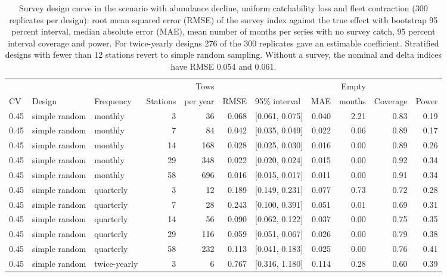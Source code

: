 \documentclass[11pt,a4paper]{article}
\begin{document}
\begin{table}[htbp]
\centering\scriptsize
\setlength{\tabcolsep}{2.5pt}
\caption{Survey design curve in the scenario with abundance decline, uniform catchability loss and fleet contraction (300 replicates per design): root mean squared error (RMSE) of the survey index against the true effect with bootstrap 95 percent interval, median absolute error (MAE), mean number of months per series with no survey catch, 95 percent interval coverage and power. For twice-yearly designs 276 of the 300 replicates gave an estimable coefficient. Stratified designs with fewer than 12 stations revert to simple random sampling. Without a survey, the nominal and delta indices have RMSE 0.054 and 0.061.}
\label{tab:designcurve}
\begin{tabular}{@{}lllrrrlrrrr@{}}
\toprule
& & & & Tows & & & & Empty & & \\
CV & Design & Frequency & Stations & per year & RMSE & 95\% interval & MAE & months & Coverage & Power \\
\midrule
0.45 & simple random & monthly &  3 &  36 & 0.068 & [0.061, 0.075] & 0.040 & 2.21 & 0.83 & 0.19 \\
0.45 & simple random & monthly &  7 &  84 & 0.042 & [0.035, 0.049] & 0.022 & 0.06 & 0.89 & 0.17 \\
0.45 & simple random & monthly & 14 & 168 & 0.028 & [0.025, 0.030] & 0.016 & 0.00 & 0.89 & 0.26 \\
0.45 & simple random & monthly & 29 & 348 & 0.022 & [0.020, 0.024] & 0.015 & 0.00 & 0.92 & 0.34 \\
0.45 & simple random & monthly & 58 & 696 & 0.016 & [0.015, 0.017] & 0.011 & 0.00 & 0.91 & 0.34 \\
0.45 & simple random & quarterly &  3 &  12 & 0.189 & [0.149, 0.231] & 0.077 & 0.73 & 0.72 & 0.28 \\
0.45 & simple random & quarterly &  7 &  28 & 0.243 & [0.100, 0.391] & 0.051 & 0.01 & 0.69 & 0.31 \\
0.45 & simple random & quarterly & 14 &  56 & 0.090 & [0.062, 0.122] & 0.037 & 0.00 & 0.75 & 0.35 \\
0.45 & simple random & quarterly & 29 & 116 & 0.059 & [0.051, 0.067] & 0.026 & 0.00 & 0.79 & 0.38 \\
0.45 & simple random & quarterly & 58 & 232 & 0.113 & [0.041, 0.183] & 0.025 & 0.00 & 0.76 & 0.41 \\
0.45 & simple random & twice-yearly &  3 &   6 & 0.767 & [0.316, 1.180] & 0.114 & 0.28 & 0.60 & 0.39 \\

\end{tabular}
\end{table}
\end{document}

